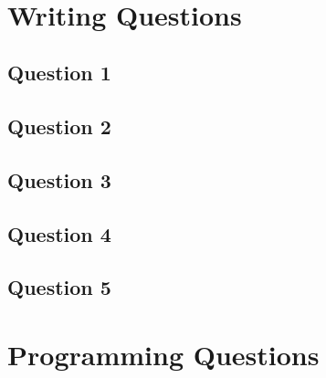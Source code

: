 \documentclass[12pt, letterpaper, twoside]{article}
\begin{document}
~
\tableofcontents

\newpage


\section{Writing Questions}
\subsection{Question 1}

\subsection{Question 2}

\subsection{Question 3}

\subsection{Question 4}

\subsection{Question 5}

\section{Programming Questions}
\end{document}
